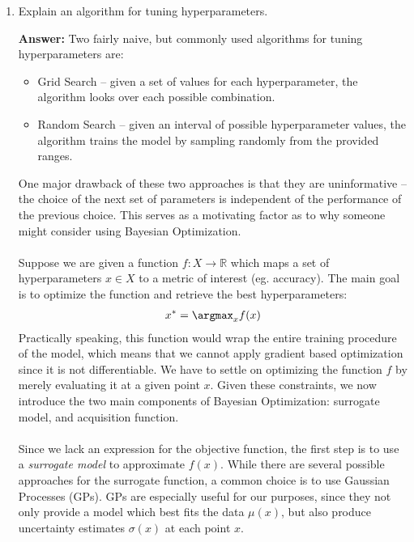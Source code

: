\documentclass{article}
\newenvironment{QandA}{\begin{enumerate}[label=\arabic*.]}{\end{enumerate}}
\newenvironment{InnerQandA}{\begin{enumerate}[label=\roman*.]}{\end{enumerate}}
\newenvironment{answer}{\par\normalfont \textbf{Answer:}}{}
\newcommand{\R}{\mathbb{R}}
\begin{document}
\begin{QandA}
\begin{InnerQandA}
        \item Explain an algorithm for tuning hyperparameters. 
        \begin{answer}
            Two fairly naive, but commonly used algorithms for tuning hyperparameters are:
            \begin{itemize}
                \item Grid Search -- given a set of values for each hyperparameter, the algorithm looks over each possible combination.
                \item Random Search -- given an interval of possible hyperparameter values, the algorithm trains the model by sampling randomly from the provided ranges.
            \end{itemize}
            One major drawback of these two approaches is that they are uninformative -- the choice of the next set of parameters is independent of the performance of the previous choice. This serves as a motivating factor as to why someone might consider using Bayesian Optimization. \\\\
            Suppose we are given a function $f: X \rightarrow \R$ which maps a set of hyperparameters $x \in X$ to a metric of interest (eg. accuracy). The main goal is to optimize the function and retrieve the best hyperparameters:
            \begin{align*}
                x^* = \argmax_x f(x)
            \end{align*}
            Practically speaking, this function would wrap the entire training procedure of the model, which means that we cannot apply gradient based optimization since it is not differentiable. We have to settle on optimizing the function $f$ by merely evaluating it at a given point $x$. Given these constraints, we now introduce the two main components of Bayesian Optimization: surrogate model, and acquisition function. \\\\
            Since we lack an expression for the objective function, the first step is to use a \textit{surrogate model} to approximate $f(x)$. While there are several possible approaches for the surrogate function, a common choice is to use Gaussian Processes (GPs). 
            GPs are especially useful for our purposes, since they not only provide a model which best fits the data $\mu(x)$, but also produce uncertainty estimates $\sigma(x)$ at each point $x$. \\\\

\end{answer}
\end{InnerQandA}
\end{QandA}
\end{document}
